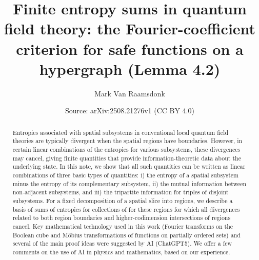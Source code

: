 \documentclass[10pt,a4paper]{amsart}
\title[Finite entropy sums in quantum field theory]{Finite entropy sums in quantum field theory: the Fourier-coefficient criterion for safe functions on a hypergraph (Lemma 4.2)}
\author{Mark Van Raamsdonk}
\date{Source: arXiv:2508.21276v1 (CC BY 4.0)}
\theoremstyle{definition}
\begin{document}
\begin{abstract}
Entropies associated with spatial subsystems in conventional local quantum field theories are typically divergent when the spatial regions have boundaries. However, in certain linear combinations of the entropies for various subsystems, these divergences may cancel, giving finite quantities that provide information-theoretic data about the underlying state. In this note, we show that all such quantities can be written as linear combinations of three basic types of quantities: i) the entropy of a spatial subsystem minus the entropy of its complementary subsystem, ii) the mutual information between non-adjacent subsystems, and iii) the tripartite information for triples of disjoint subsystems. For a fixed decomposition of a spatial slice into regions, we describe a basis of sums of entropies for collections of for these regions for which all divergences related to both region boundaries and higher-codimension intersections of regions cancel. Key mathematical technology used in this work (Fourier transforms on the Boolean cube and M\"obius transformations of functions on partially ordered sets) and several of the main proof ideas were suggested by AI (ChatGPT5). We offer a few comments on the use of AI in physics and mathematics, based on our experience. 
\end{abstract}
\maketitle
\end{document}
